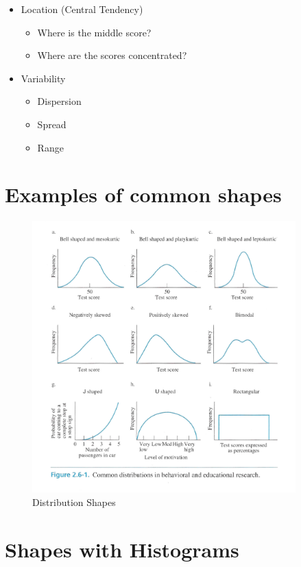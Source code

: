 \documentclass[12pt]{article}
\begin{document}
\begin{itemize}
\itemsep1pt\parskip0pt
\item
  Location (Central Tendency)

  \begin{itemize}
  \itemsep1pt\parskip0pt
  \item
    Where is the middle score?
  \item
    Where are the scores concentrated?
  \end{itemize}
\item
  Variability

  \begin{itemize}
  \itemsep1pt\parskip0pt
  \item
    Dispersion
  \item
    Spread
  \item
    Range
  \end{itemize}
\end{itemize}

\section{Examples of common shapes}\label{examples-of-common-shapes}

\begin{figure}[H]
\centering
\includegraphics[width=4in]{Dist_shape.png}
\caption{Distribution Shapes}
\end{figure}

\section{Shapes with Histograms}\label{shapes-with-histograms}
\end{document}
